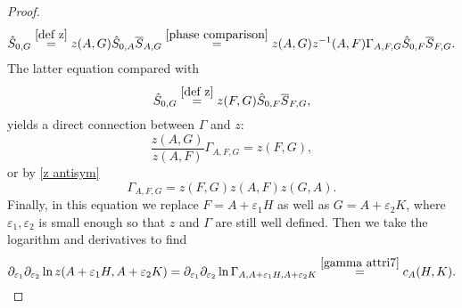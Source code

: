 \documentclass[b5paper,draft,openbib,12pt]{memoir}
\begin{document}
\begin{proof}
\begin{align}
\hat{S}_{0,G}\overset{\eqref{def z}}{=}z(A,G)\hat{S}_{0,A}\overline{S}_{A,G}\overset{\eqref{phase comparison}}{=}z(A,G)z^{-1}(A,F)\Gamma_{A,F,G}\hat{S}_{0,F}\overline{S}_{F,G}.
\end{align}
The latter equation compared with 
\begin{equation}
\hat{S}_{0,G}\overset{\eqref{def z}}{=}z(F,G)\hat{S}_{0,F}\overline{S}_{F,G},
\end{equation}
yields  a direct connection between \(\Gamma\) and \(z\):
\begin{equation}
\frac{z(A,G)}{z(A,F)}\Gamma_{A,F,G}=z(F,G),
\end{equation}
or by \eqref{z antisym}
\begin{equation}
\Gamma_{A,F,G}=z(F,G)z(A,F)z(G,A).
\end{equation}
Finally, in this equation we replace \(F=A+\varepsilon_1 H\) as well as  \(G=A+\varepsilon_2 K\), where \(\varepsilon_1,\varepsilon_2\) is small enough so that 
\(z\) and \(\Gamma\) are still well defined. Then we take the logarithm and derivatives to find
\begin{equation}
 \partial_{\varepsilon_1}\partial_{\varepsilon_2}\ln  z(A+\varepsilon_1 H,A+\varepsilon_2 K)=\partial_{\varepsilon_1}\partial_{\varepsilon_2}\ln\Gamma_{A,A+\varepsilon_1 H,A+\varepsilon_2 K}\overset{\eqref{gamma attri7}}{=}c_A(H,K). 
\end{equation}

\end{proof}
\end{document}
